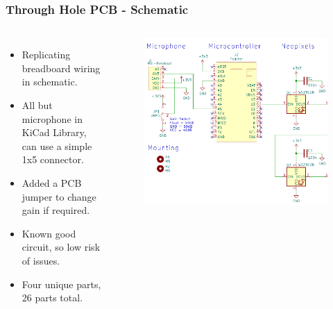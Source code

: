 \documentclass[aspectratio=169, t]{beamer}
\begin{document}
\begin{frame}
\frametitle{Through Hole PCB - Schematic}
\vspace{-5mm}
\begin{columns}
	\begin{itemize}
		\item Replicating breadboard wiring in schematic.
		\item All but microphone in KiCad Library, can use a simple 1x5 connector.
		\item Added a PCB jumper to change gain if required.
		\item Known good circuit, so low risk of issues.
		\item Four unique parts, 26 parts total.
	\end{itemize}
	\begin{figure}
		\includegraphics[width=0.9\linewidth]{images/module-schematic.png}
	\end{figure}
\end{columns}
\end{frame}
\end{document}
